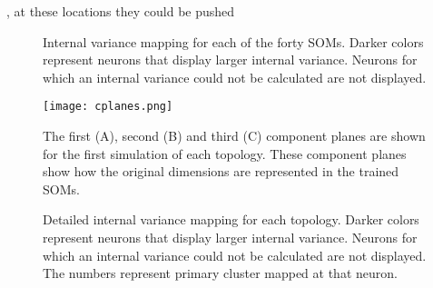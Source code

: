  , at these locations they could be pushed 

\begin{figure}
\centering
\begin{minipage}{\textwidth}
\caption{Internal variance mapping for each of the forty SOMs. Darker colors
represent neurons that display larger internal variance. Neurons for which
an internal variance could not be calculated are not displayed.}
\label{ten}
\end{minipage}
\end{figure}

\begin{figure}
\begin{minipage}{\textwidth}
  \texttt{[image: cplanes.png]}
  \caption{The first (A), second (B) and third (C) component planes are shown
for the first simulation of each topology.  These component planes show how
the original dimensions are represented in the trained SOMs.}
  \label{cplanes}
\end{minipage}\end{figure}


\begin{figure}
\centering
\begin{minipage}{\textwidth}
\caption{Detailed internal variance mapping for each topology. Darker colors
represent neurons that display larger internal variance. Neurons for which
an internal variance could not be calculated are not displayed. The numbers
represent primary cluster mapped at that neuron.}
\label{cluster}
\end{minipage}
\end{figure}




